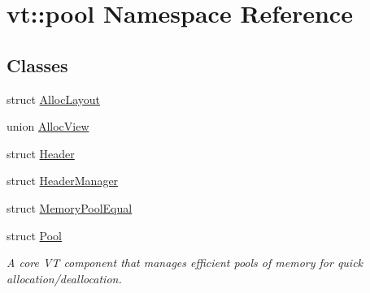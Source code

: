 \hypertarget{namespacevt_1_1pool}{}\section{vt\+:\+:pool Namespace Reference}
\label{namespacevt_1_1pool}
\subsection*{Classes}
\begin{DoxyCompactItemize}
\item 
struct \hyperlink{structvt_1_1pool_1_1_alloc_layout}{Alloc\+Layout}
\item 
union \hyperlink{unionvt_1_1pool_1_1_alloc_view}{Alloc\+View}
\item 
struct \hyperlink{structvt_1_1pool_1_1_header}{Header}
\item 
struct \hyperlink{structvt_1_1pool_1_1_header_manager}{Header\+Manager}
\item 
struct \hyperlink{structvt_1_1pool_1_1_memory_pool_equal}{Memory\+Pool\+Equal}
\item 
struct \hyperlink{structvt_1_1pool_1_1_pool}{Pool}
\begin{DoxyCompactList}\small\item\em A core VT component that manages efficient pools of memory for quick allocation/deallocation. \end{DoxyCompactList}\end{DoxyCompactItemize}
